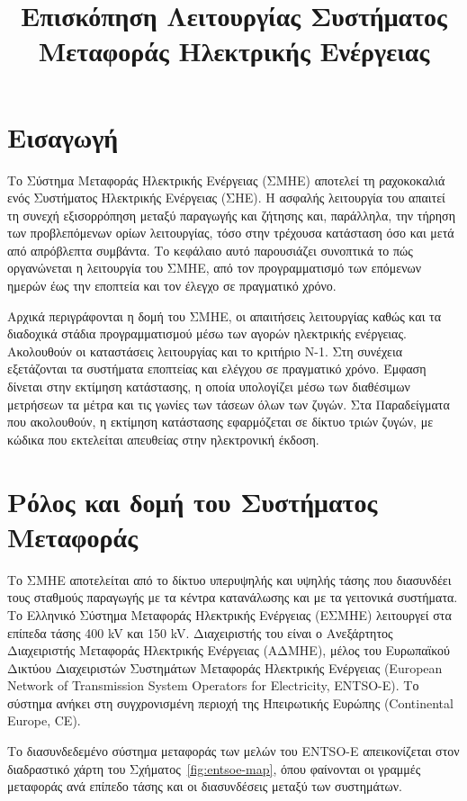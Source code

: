 \title{Επισκόπηση Λειτουργίας Συστήματος Μεταφοράς Ηλεκτρικής Ενέργειας}

\section{Εισαγωγή}
\label{kef-01-theoria}

Το Σύστημα Μεταφοράς Ηλεκτρικής Ενέργειας (ΣΜΗΕ) αποτελεί τη ραχοκοκαλιά ενός Συστήματος
Ηλεκτρικής Ενέργειας (ΣΗΕ). Η ασφαλής λειτουργία του απαιτεί τη συνεχή εξισορρόπηση μεταξύ
παραγωγής και ζήτησης και, παράλληλα, την τήρηση των προβλεπόμενων ορίων λειτουργίας, τόσο στην τρέχουσα κατάσταση όσο
και μετά από απρόβλεπτα συμβάντα. Το κεφάλαιο αυτό παρουσιάζει συνοπτικά το πώς οργανώνεται η
λειτουργία του ΣΜΗΕ, από τον προγραμματισμό των επόμενων ημερών έως την εποπτεία και τον
έλεγχο σε πραγματικό χρόνο.

Αρχικά περιγράφονται η δομή του ΣΜΗΕ, οι απαιτήσεις λειτουργίας καθώς και τα
διαδοχικά στάδια προγραμματισμού μέσω των αγορών ηλεκτρικής ενέργειας. Ακολουθούν οι καταστάσεις λειτουργίας και το κριτήριο N-1. Στη συνέχεια εξετάζονται τα συστήματα εποπτείας και ελέγχου σε πραγματικό χρόνο.
Έμφαση δίνεται στην εκτίμηση κατάστασης, η οποία υπολογίζει μέσω των διαθέσιμων μετρήσεων τα
μέτρα και τις γωνίες των τάσεων όλων των ζυγών. Στα
Παραδείγματα που ακολουθούν, η εκτίμηση κατάστασης εφαρμόζεται σε δίκτυο τριών ζυγών, με κώδικα που
εκτελείται απευθείας στην ηλεκτρονική έκδοση.


\section{Ρόλος και δομή του Συστήματος Μεταφοράς}
\label{sec:structure}

Το ΣΜΗΕ αποτελείται από το δίκτυο υπερυψηλής και υψηλής τάσης που διασυνδέει τους σταθμούς παραγωγής με τα κέντρα κατανάλωσης και με τα γειτονικά
συστήματα. Το Ελληνικό Σύστημα Μεταφοράς Ηλεκτρικής Ενέργειας (ΕΣΜΗΕ) λειτουργεί στα επίπεδα
τάσης 400 kV και 150 kV. Διαχειριστής του είναι ο Ανεξάρτητος Διαχειριστής Μεταφοράς
Ηλεκτρικής Ενέργειας (ΑΔΜΗΕ), μέλος του Ευρωπαϊκού Δικτύου Διαχειριστών Συστημάτων Μεταφοράς
Ηλεκτρικής Ενέργειας (European Network of Transmission System
Operators for Electricity, ENTSO-E). Το σύστημα ανήκει στη
συγχρονισμένη περιοχή της Ηπειρωτικής Ευρώπης (Continental Europe, CE).

Το διασυνδεδεμένο σύστημα μεταφοράς των μελών του ENTSO-E απεικονίζεται στον διαδραστικό
χάρτη του Σχήματος~\ref{fig:entsoe-map}, όπου φαίνονται οι γραμμές μεταφοράς ανά επίπεδο
τάσης και οι διασυνδέσεις μεταξύ των συστημάτων.


